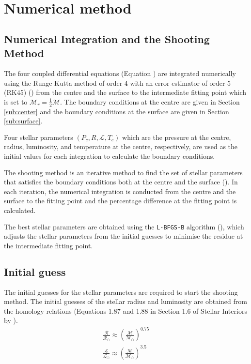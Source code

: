 \documentclass[twocolumn]{aastex631}
\begin{document}
\section{Numerical method}
\label{sec:numerical_method}

\subsection{Numerical Integration and the Shooting Method}
\label{subsec:numerical_integration_shooting}

The four coupled differential equations (Equation ) are integrated numerically using the Runge-Kutta method of order 4 with an error estimator of order 5 (RK45) (\cite{article:RK45}) from the centre and the surface to the intermediate fitting point which is set to $\mathcal{M}_r = \frac{1}{2} \mathcal{M}$. The boundary conditions at the centre are given in Section \ref{sub:center} and the boundary conditions at the surface are given in Section \ref{sub:surface}.

Four stellar parameters $(P_c, R, \mathcal{L}, T_c)$ which are the pressure at the centre, radius, luminosity, and temperature at the centre, respectively, are used as the initial values for each integration to calculate the boundary conditions.

The shooting method is an iterative method to find the set of stellar parameters that satisfies the boundary conditions both at the centre and the surface (\cite{book:NumericalRecipes}).
In each iteration, the numerical integration is conducted from the centre and the surface to the fitting point and the percentage difference at the fitting point is calculated.

The best stellar parameters are obtained using the \verb|L-BFGS-B| algorithm (\cite{article:optimization}), which adjusts the stellar parameters from the initial guesses to minimise the residue at the intermediate fitting point.

\subsection{Initial guess}
\label{subsec:initial_guess}
The initial guesses for the stellar parameters are required to start the shooting method. The initial guesses of the stellar radius and luminosity are obtained from the homology relations (Equations 1.87 and 1.88 in Section 1.6 of Stellar Interiors by \cite{book:StellarInteriors}).
\begin{eqnarray}
	\frac{\mathcal{R}}{\mathcal{R}_{\odot}} \approx\left(\frac{\mathcal{M}}{\mathcal{M}_{\odot}}\right)^{0.75} \\
	\frac{\mathcal{L}}{\mathcal{L}_{\odot}} \approx\left(\frac{\mathcal{M}}{\mathcal{M}_{\odot}}\right)^{3.5}
\end{eqnarray}
\end{document}
